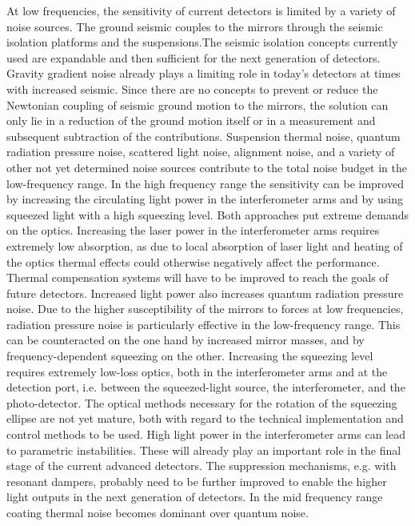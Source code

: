 At low frequencies, the sensitivity of current detectors is limited by a variety of noise sources. The ground seismic couples to the mirrors through the seismic isolation platforms and the suspensions.The seismic isolation concepts currently used are expandable and then sufficient for the next generation of detectors. Gravity gradient noise already plays a limiting role in today's detectors at times with increased seismic. Since there are no concepts to prevent or reduce the Newtonian coupling of seismic ground motion to the mirrors, the solution can only lie in a reduction of the ground motion itself or in a measurement and subsequent subtraction of the contributions. Suspension thermal noise, quantum radiation pressure noise, scattered light noise, alignment noise, and a variety of other not yet determined noise sources contribute to the total noise budget in the low-frequency range.
In the high frequency range the sensitivity can be improved by increasing the circulating light power in the interferometer arms and by using squeezed light with a high squeezing level. Both approaches put extreme demands on the optics. Increasing the laser power in the interferometer arms requires extremely low absorption, as due to local absorption of laser light and heating of the optics thermal effects could otherwise negatively affect the performance. Thermal compensation systems will have to be improved to reach the goals of future detectors. Increased light power also increases quantum radiation pressure noise. Due to the higher susceptibility of the mirrors to forces at low frequencies, radiation pressure noise is particularly effective in the low-frequency range. This can be counteracted on the one hand by increased mirror masses, and by frequency-dependent squeezing on the other. Increasing the squeezing level requires extremely low-loss optics, both in the interferometer arms and at the detection port, i.e. between the squeezed-light source, the interferometer, and the photo-detector. The optical methods necessary for the rotation of the squeezing ellipse are not yet mature, both with regard to the technical implementation and control methods to be used. High light power in the interferometer arms can lead to parametric instabilities. These will already play an important role in the final stage of the current advanced detectors. The suppression mechanisms, e.g. with resonant dampers, probably need to be further improved to enable the higher light outputs in the next generation of detectors.
In the mid frequency range coating thermal noise becomes dominant over quantum noise.
